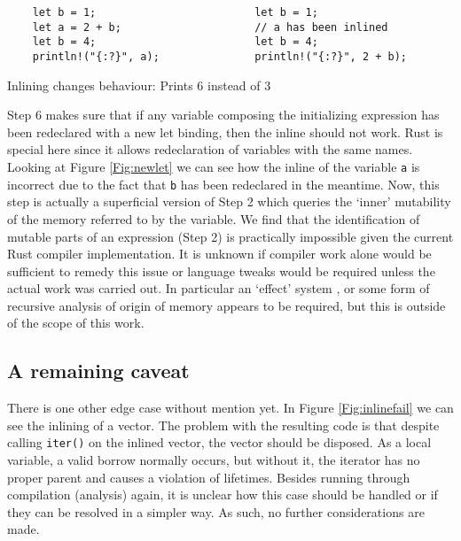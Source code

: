\begin{fig}[H]
\begin{verbatim}
    let b = 1;                         let b = 1;
    let a = 2 + b;                     // a has been inlined
    let b = 4;                         let b = 4;
    println!("{:?}", a);               println!("{:?}", 2 + b);
\end{verbatim}
\caption{Inlining changes behaviour: Prints 6 instead of 3}
\label{Fig:newlet}
\end{fig}

Step 6 makes sure that if any variable composing the initializing expression has been redeclared with a new let binding, then the inline should not work. Rust is special here since it allows redeclaration of variables with the same names. Looking at Figure \ref{Fig:newlet} we can see how the inline of the variable {\verb|a|} is incorrect due to the fact that {\verb|b|} has been redeclared in the meantime. Now, this step is actually a superficial version of Step 2 which queries the `inner' mutability of the memory referred to by the variable. We find that the identification of mutable parts of an expression (Step 2) is practically impossible given the current Rust compiler implementation. It is unknown if compiler work alone would be sufficient to remedy this issue or language tweaks would be required unless the actual work was carried out. In particular an `effect' system \cite{effects}, or some form of recursive analysis of origin of memory appears to be required, but this is outside of the scope of this work.




\subsection{A remaining caveat}
There is one other edge case without mention yet. In Figure \ref{Fig:inlinefail} we can see the inlining of a vector. The problem with the resulting code is that despite calling {\verb|iter()|} on the inlined vector, the vector should be disposed. As a local variable, a valid borrow normally occurs, but without it, the iterator has no proper parent and causes a violation of lifetimes. Besides running through compilation (analysis) again, it is unclear how this case should be handled or if they can be resolved in a simpler way. As such, no further considerations are made.

